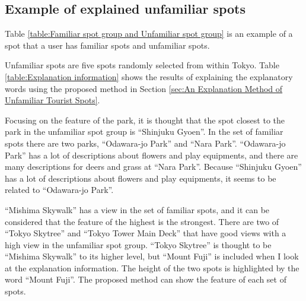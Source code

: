 \documentclass[journal]{IAENGtran}
\begin{document}
\subsection{Example of explained unfamiliar spots}
\label{subsec:Example of explained unfamiliar spots}

Table \ref{table:Familiar spot group and Unfamiliar spot group} is an example of a spot that a user has familiar spots and unfamiliar spots.

Unfamiliar spots are five spots randomly selected from within Tokyo.
Table \ref{table:Explanation information} shows the results of explaining the explanatory words using the proposed method in Section \ref{sec:An Explanation Method of Unfamiliar Tourist Spots}.

Focusing on the feature of the park, it is thought that the spot closest to the park in the unfamiliar spot group is ``Shinjuku Gyoen''.
In the set of familiar spots there are two parks, ``Odawara-jo Park'' and ``Nara Park''.
``Odawara-jo Park'' has a lot of descriptions about flowers and play equipments, and there are many descriptions for deers and grass at ``Nara Park''.
Because ``Shinjuku Gyoen'' has a lot of descriptions about flowers and play equipments, it seems to be related to ``Odawara-jo Park''.

``Mishima Skywalk'' has a view in the set of familiar spots, and it can be considered that the feature of the highest is the strongest.
There are two of ``Tokyo Skytree'' and ``Tokyo Tower Main Deck'' that have good views with a high view in the unfamiliar spot group.
``Tokyo Skytree'' is thought to be ``Mishima Skywalk'' to its higher level, but ``Mount Fuji'' is included when I look at the explanation information.
The height of the two spots is highlighted by the word ``Mount Fuji''.
The proposed method can show the feature of each set of spots.
\end{document}
